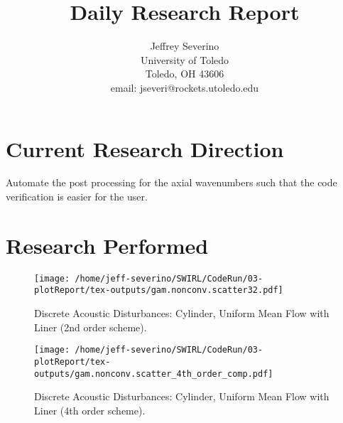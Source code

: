 \documentclass[a4paper]{article}
\begin{document}
\begin{titlepage}

    \title{
    Daily Research Report}

    \author{ Jeffrey Severino \\
        University of Toledo \\
        Toledo, OH  43606 \\
    email: jseveri@rockets.utoledo.edu}


    \maketitle

\end{titlepage}
\section{Current Research Direction}
Automate the post processing for the axial wavenumbers such that the code 
verification is easier for the user.

\section{Research Performed}
\begin{figure}                                                                 
    \centering                                                                 
    \texttt{[image: /home/jeff-severino/SWIRL/CodeRun/03-plotReport/tex-outputs/gam.nonconv.scatter32.pdf]}
    \caption{Discrete Acoustic Disturbances: Cylinder, Uniform Mean Flow with Liner (2nd order scheme).}
\end{figure}                                                                   




\begin{figure}                                                                 
    \centering                                                                 
    \texttt{[image: /home/jeff-severino/SWIRL/CodeRun/03-plotReport/tex-outputs/gam.nonconv.scatter\_4th\_order\_comp.pdf]}
    \caption{Discrete Acoustic Disturbances: Cylinder, Uniform Mean Flow with Liner (4th order scheme).}
\end{figure}                                                                   
\end{document}
